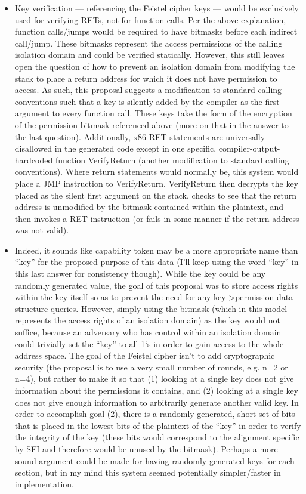 \documentclass[12pt]{article}
\begin{document}
\begin{itemize}
	\item Key verification — referencing the Feistel cipher keys — would be exclusively used for verifying RETs, not for function calls. Per the above explanation, function calls/jumps would be required to have bitmasks before each indirect call/jump. These bitmasks represent the access permissions of the calling isolation domain and could be verified statically. However, this still leaves open the question of how to prevent an isolation domain from modifying the stack to place a return address for which it does not have permission to access. As such, this proposal suggests a modification to standard calling conventions such that a key is silently added by the compiler as the first argument to every function call. These keys take the form of the encryption of the permission bitmask referenced above (more on that in the answer to the last question). Additionally, x86 RET statements are universally disallowed in the generated code except in one specific, compiler-output-hardcoded function VerifyReturn (another modification to standard calling conventions). Where return statements would normally be, this system would place a JMP instruction to VerifyReturn. VerifyReturn then decrypts the key placed as the silent first argument on the stack, checks to see that the return address is unmodified by the bitmask contained within the plaintext, and then invokes a RET instruction (or fails in some manner if the return address was not valid).
	
	\item Indeed, it sounds like capability token may be a more appropriate name than “key” for the proposed purpose of this data (I’ll keep using the word “key” in this last answer for consistency though). While the key could be any randomly generated value, the goal of this proposal was to store access rights within the key itself so as to prevent the need for any key->permission data structure queries. However, simply using the bitmask (which in this model represents the access rights of an isolation domain) as the key would not suffice, because an adversary who has control within an isolation domain could trivially set the “key” to all 1‘s in order to gain access to the whole address space. The goal of the Feistel cipher isn’t to add cryptographic security (the proposal is to use a very small number of rounds, e.g. n=2 or n=4), but rather to make it so that (1) looking at a single key does not give information about the permissions it contains, and (2) looking at a single key does not give enough information to arbitrarily generate another valid key. In order to accomplish goal (2), there is a randomly generated, short set of bits that is placed in the lowest bits of the plaintext of the “key” in order to verify the integrity of the key (these bits would correspond to the alignment specific by SFI and therefore would be unused by the bitmask). Perhaps a more sound argument could be made for having randomly generated keys for each section, but in my mind this system seemed potentially simpler/faster in implementation.
	

\end{itemize}
\end{document}
